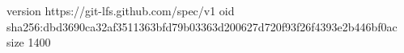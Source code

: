 version https://git-lfs.github.com/spec/v1
oid sha256:dbd3690ca32af3511363bfd79b03363d200627d720f93f26f4393e2b446bf0ac
size 1400
